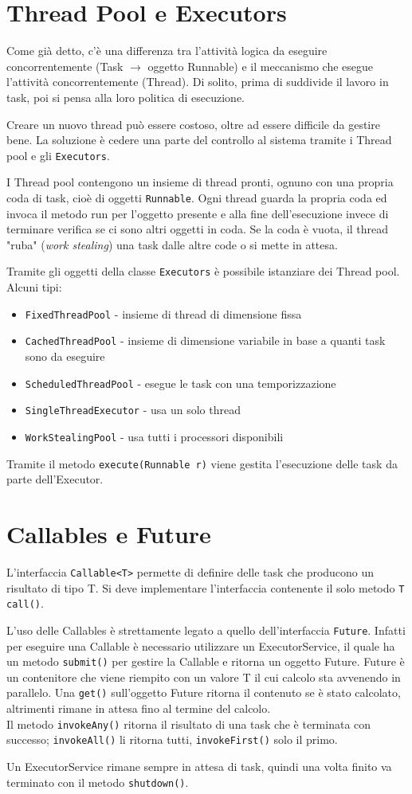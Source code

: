 \section{Thread Pool e Executors}
Come già detto, c'è una differenza tra l'attività logica da eseguire concorrentemente (Task $\rightarrow$ oggetto Runnable) e il meccanismo che esegue l'attività concorrentemente (Thread). Di solito, prima di suddivide il lavoro in task, poi si pensa alla loro politica di esecuzione.

Creare un nuovo thread può essere costoso, oltre ad essere difficile da gestire bene. La soluzione è cedere una parte del controllo al sistema tramite i Thread pool e gli \texttt{Executors}.

I Thread pool contengono un insieme di thread pronti, ognuno con una propria coda di task, cioè di oggetti \texttt{Runnable}. Ogni thread guarda la propria coda ed invoca il metodo run per l'oggetto presente e alla fine dell'esecuzione invece di terminare verifica se ci sono altri oggetti in coda. Se la coda è vuota, il thread "ruba" (\textit{work stealing}) una task dalle altre code o si mette in attesa.

Tramite gli oggetti della classe \texttt{Executors} è possibile istanziare dei Thread pool. Alcuni tipi:
\begin{itemize}
\item \texttt{FixedThreadPool} - insieme di thread di dimensione fissa
\item \texttt{CachedThreadPool} - insieme di dimensione variabile in base a quanti task sono da eseguire
\item \texttt{ScheduledThreadPool} - esegue le task con una temporizzazione
\item \texttt{SingleThreadExecutor} - usa un solo thread
\item \texttt{WorkStealingPool} - usa tutti i processori disponibili
\end{itemize}
Tramite il metodo \texttt{execute(Runnable r)} viene gestita l'esecuzione delle task da parte dell'Executor.

\section{Callables e Future}
L'interfaccia \texttt{Callable<T>} permette di definire delle task che producono un risultato di tipo T. Si deve implementare l'interfaccia contenente il solo metodo \texttt{T call()}.

L'uso delle Callables è strettamente legato a quello dell'interfaccia \texttt{Future}. Infatti per eseguire una Callable è necessario utilizzare un ExecutorService, il quale ha un metodo \texttt{submit()} per gestire la Callable e ritorna un oggetto Future. Future è un contenitore che viene riempito con un valore T il cui calcolo sta avvenendo in parallelo. Una \texttt{get()} sull'oggetto Future ritorna il contenuto se è stato calcolato, altrimenti rimane in attesa fino al termine del calcolo. \\
Il metodo \texttt{invokeAny()} ritorna il risultato di una task che è terminata con successo; \texttt{invokeAll()} li ritorna tutti, \texttt{invokeFirst()} solo il primo.

Un ExecutorService rimane sempre in attesa di task, quindi una volta finito va terminato con il metodo \texttt{shutdown()}.
